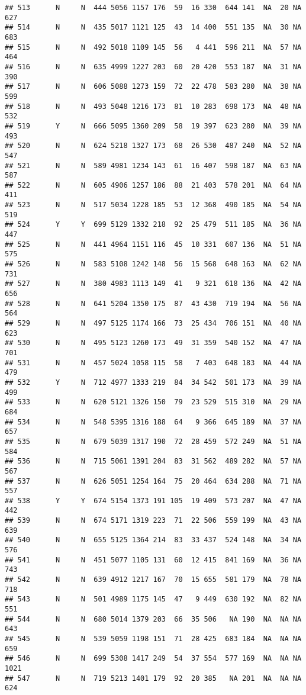 \documentclass[]{article}
\begin{document}
\begin{verbatim}
## 513      N     N  444 5056 1157 176  59  16 330  644 141  NA  20 NA  627
## 514      N     N  435 5017 1121 125  43  14 400  551 135  NA  30 NA  683
## 515      N     N  492 5018 1109 145  56   4 441  596 211  NA  57 NA  464
## 516      N     N  635 4999 1227 203  60  20 420  553 187  NA  31 NA  390
## 517      N     N  606 5088 1273 159  72  22 478  583 280  NA  38 NA  599
## 518      N     N  493 5048 1216 173  81  10 283  698 173  NA  48 NA  532
## 519      Y     N  666 5095 1360 209  58  19 397  623 280  NA  39 NA  493
## 520      N     N  624 5218 1327 173  68  26 530  487 240  NA  52 NA  547
## 521      N     N  589 4981 1234 143  61  16 407  598 187  NA  63 NA  587
## 522      N     N  605 4906 1257 186  88  21 403  578 201  NA  64 NA  411
## 523      N     N  517 5034 1228 185  53  12 368  490 185  NA  54 NA  519
## 524      Y     Y  699 5129 1332 218  92  25 479  511 185  NA  36 NA  447
## 525      N     N  441 4964 1151 116  45  10 331  607 136  NA  51 NA  575
## 526      N     N  583 5108 1242 148  56  15 568  648 163  NA  62 NA  731
## 527      N     N  380 4983 1113 149  41   9 321  618 136  NA  42 NA  656
## 528      N     N  641 5204 1350 175  87  43 430  719 194  NA  56 NA  564
## 529      N     N  497 5125 1174 166  73  25 434  706 151  NA  40 NA  623
## 530      N     N  495 5123 1260 173  49  31 359  540 152  NA  47 NA  701
## 531      N     N  457 5024 1058 115  58   7 403  648 183  NA  44 NA  479
## 532      Y     N  712 4977 1333 219  84  34 542  501 173  NA  39 NA  499
## 533      N     N  620 5121 1326 150  79  23 529  515 310  NA  29 NA  684
## 534      N     N  548 5395 1316 188  64   9 366  645 189  NA  37 NA  657
## 535      N     N  679 5039 1317 190  72  28 459  572 249  NA  51 NA  584
## 536      N     N  715 5061 1391 204  83  31 562  489 282  NA  57 NA  567
## 537      N     N  626 5051 1254 164  75  20 464  634 288  NA  71 NA  557
## 538      Y     Y  674 5154 1373 191 105  19 409  573 207  NA  47 NA  442
## 539      N     N  674 5171 1319 223  71  22 506  559 199  NA  43 NA  639
## 540      N     N  655 5125 1364 214  83  33 437  524 148  NA  34 NA  576
## 541      N     N  451 5077 1105 131  60  12 415  841 169  NA  36 NA  743
## 542      N     N  639 4912 1217 167  70  15 655  581 179  NA  78 NA  718
## 543      N     N  501 4989 1175 145  47   9 449  630 192  NA  82 NA  551
## 544      N     N  680 5014 1379 203  66  35 506   NA 190  NA  NA NA  643
## 545      N     N  539 5059 1198 151  71  28 425  683 184  NA  NA NA  659
## 546      N     N  699 5308 1417 249  54  37 554  577 169  NA  NA NA 1021
## 547      N     N  719 5213 1401 179  92  20 385   NA 201  NA  NA NA  624

\end{verbatim}
\end{document}
